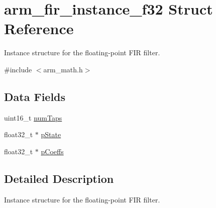 \hypertarget{structarm__fir__instance__f32}{\section{arm\-\_\-fir\-\_\-instance\-\_\-f32 Struct Reference}
\label{structarm__fir__instance__f32}
}


Instance structure for the floating-\/point F\-I\-R filter.  




{\ttfamily \#include $<$arm\-\_\-math.\-h$>$}

\subsection*{Data Fields}
\begin{DoxyCompactItemize}
\item 
uint16\-\_\-t \hyperlink{structarm__fir__instance__f32_a751941891e47f522a7f5375fe8990aac}{num\-Taps}
\item 
float32\-\_\-t $\ast$ \hyperlink{structarm__fir__instance__f32_a335c87e6fdc4b96601d95a5de8b9c463}{p\-State}
\item 
float32\-\_\-t $\ast$ \hyperlink{structarm__fir__instance__f32_aacbb8dd8eeba4b21fc2bb40076405ee3}{p\-Coeffs}
\end{DoxyCompactItemize}


\subsection{Detailed Description}
Instance structure for the floating-\/point F\-I\-R filter. 

